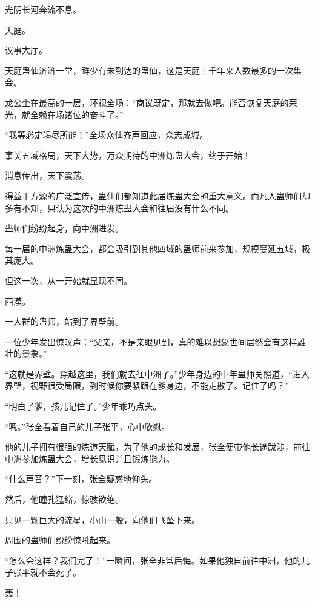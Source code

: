
\begin{this_body}

光阴长河奔流不息。

天庭。

议事大厅。

天庭蛊仙济济一堂，鲜少有未到达的蛊仙，这是天庭上千年来人数最多的一次集会。

龙公坐在最高的一层，环视全场：“商议既定，那就去做吧。能否恢复天庭的荣光，就全赖在场诸位的奋斗了。”

“我等必定竭尽所能！”全场众仙齐声回应，众志成城。

事关五域格局，天下大势，万众期待的中洲炼蛊大会，终于开始！

消息传出，天下震荡。

得益于方源的广泛宣传，蛊仙们都知道此届炼蛊大会的重大意义。而凡人蛊师们却多有不知，只认为这次的中洲炼蛊大会和往届没有什么不同。

蛊师们纷纷起身，向中洲进发。

每一届的中洲炼蛊大会，都会吸引到其他四域的蛊师前来参加，规模蔓延五域，极其庞大。

但这一次，从一开始就显现不同。

西漠。

一大群的蛊师，站到了界壁前。

一位少年发出惊叹声：“父亲，不是亲眼见到，真的难以想象世间居然会有这样雄壮的景象。”

“这就是界壁。穿越这里，我们就去往中洲了。”少年身边的中年蛊师关照道，“进入界壁，视野很受局限，到时候你要紧跟在爹身边，不能走散了。记住了吗？”

“明白了爹，孩儿记住了。”少年乖巧点头。

“嗯。”张全看着自己的儿子张平，心中欣慰。

他的儿子拥有很强的炼道天赋，为了他的成长和发展，张全便带他长途跋涉，前往中洲参加炼蛊大会，增长见识并且锻炼能力。

“什么声音？”下一刻，张全疑惑地仰头。

然后，他瞳孔猛缩，惊骇欲绝。

只见一颗巨大的流星，小山一般，向他们飞坠下来。

周围的蛊师们纷纷惊吼起来。

“怎么会这样？我们完了！”一瞬间，张全非常后悔。如果他独自前往中洲，他的儿子张平就不会死了。

轰！


\end{this_body}
